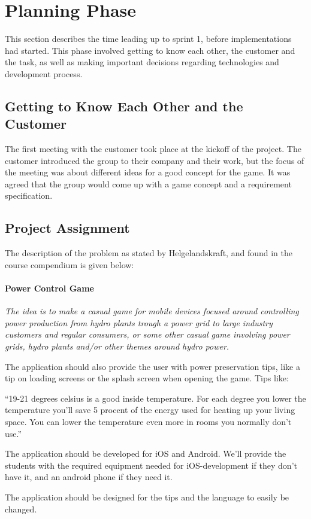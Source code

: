 \section{Planning Phase}

	This section describes the time leading up to sprint 1, before implementations had started. This phase involved getting to know each other, the customer and the task, as well as making important decisions regarding technologies and development process.

\subsection{Getting to Know Each Other and the Customer}

	The first meeting with the customer took place at the kickoff of the project. 
	The customer introduced the group to their company and their work, but the focus 
	of the meeting was about different ideas for a good concept for the game.
	It was agreed that the group would come up with a game concept and a requirement 
	specification.

\subsection{Project Assignment}
	
	The description of the problem as stated by Helgelandskraft, 
	and found in the course compendium is given below: 
		\paragraph{Power Control Game}
		{\it The idea is to make a casual game for mobile devices focused around controlling 
		power production from hydro plants trough a power grid to large industry customers and 
		regular consumers, or some other casual game involving power grids, hydro plants 
		and/or other themes around hydro power. 
		 
		The application should also provide the user with power preservation tips, like a 
		tip on loading screens or the splash screen when opening the game. Tips like: 
		 
		“19-21 degrees celsius is a good inside temperature. For each degree you lower the temperature 
		you’ll save 5 procent of the energy used for heating up your living space. 
		You can lower the temperature even more in rooms you normally don’t use.” 
		 
		The application should be developed for iOS and Android. We’ll provide the 
		students with the required equipment needed for iOS-development if they don’t 
		have it, and an android phone if they need it. 
		 
		The application should be designed for the tips and the language to easily be changed.}

